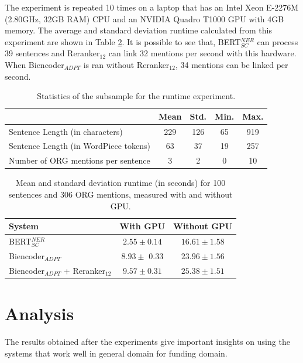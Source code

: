 \documentclass{report}
\theoremstyle{definition}
\theoremstyle{remark}
\begin{document}
The experiment is repeated 10 times on a laptop that has an Intel Xeon E-2276M (2.80GHz, 32GB RAM) CPU and an NVIDIA Quadro T1000 GPU with 4GB memory. The average and standard deviation runtime calculated from this experiment are shown in Table \ref{tab:efficiencyresults}. It is possible to see that, BERT$_{SC}^{NER}$ can process 39 sentences and Reranker$_{12}$ can link 32 mentions per second with this hardware. When Biencoder$_{ADPT}$ is ran without Reranker$_{12}$, 34 mentions can be linked per second.

\begin{table}[H]
    \centering
    \begin{tabular}{l|cccc}
    &  Mean & Std. & Min. & Max.\\
    \hline
    Sentence Length (in characters) &  229 & 126 & 65 & 919\\
    Sentence Length (in WordPiece tokens) & 63 & 37 & 19 & 257\\
    Number of ORG mentions per sentence & 3 & 2 & 0 & 10\\
    \end{tabular}
    \caption{Statistics of the subsample for the runtime experiment.}
    \label{tab:efficiencystats}
\end{table}

\begin{table}[H]
    \centering
    \begin{tabular}{l|cc}
    System   & With GPU & Without GPU  \\
    \hline
    BERT$_{SC}^{NER}$  & $2.55 \pm 0.14$ & $16.61 \pm 1.58$\\
    Biencoder$_{ADPT}$ & $8.93 \pm $ 0.33 & $23.96 \pm 1.56$\\
    Biencoder$_{ADPT}$ + Reranker$_{12}$ & $9.57 \pm 0.31$ &$25.38 \pm 1.51$\\
    \end{tabular}
    \caption{Mean and standard deviation runtime (in seconds) for 100 sentences and 306 ORG mentions, measured with and without GPU.}
    \label{tab:efficiencyresults}
\end{table}

\section{Analysis}
\label{sec:EvalAnalysis}

The results obtained after the experiments give important insights on using the systems that work well in general domain for funding domain. 
\end{document}
